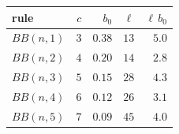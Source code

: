 \begin{center}
\footnotesize\setlength{\tabcolsep}{5pt}
\begin{tabular}{lrrrr}
\hline
rule & $c$ & $b_0$ & $\ell$ & $\ell\,b_0$\\
\hline
$BB(n,1)$ & $3$ & $0.38$ & $13$ & $5.0$\\
$BB(n,2)$ & $4$ & $0.20$ & $14$ & $2.8$\\
$BB(n,3)$ & $5$ & $0.15$ & $28$ & $4.3$\\
$BB(n,4)$ & $6$ & $0.12$ & $26$ & $3.1$\\
$BB(n,5)$ & $7$ & $0.09$ & $45$ & $4.0$\\
\hline
\end{tabular}
\end{center}
